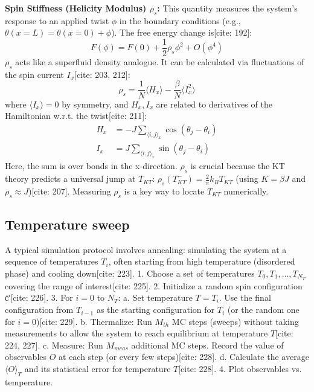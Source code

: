 \documentclass[11pt]{article}
\begin{document}
\textbf{Spin Stiffness (Helicity Modulus) $\rho_s$:}
This quantity measures the system's response to an applied twist $\phi$ in the boundary conditions (e.g., $\theta(x=L) = \theta(x=0) + \phi$). The free energy change is[cite: 192]:
\begin{equation}
F(\phi) = F(0) + \frac{1}{2} \rho_s \phi^2 + O(\phi^4) \label{eq:stiffness_F}
\end{equation}
$\rho_s$ acts like a superfluid density analogue. It can be calculated via fluctuations of the spin current $I_x$[cite: 203, 212]:
\begin{equation}
\rho_s = \frac{1}{N} \langle H_x \rangle - \frac{\beta}{N} \langle I_x^2 \rangle \label{eq:stiffness_fluct}
\end{equation}
where $\langle I_x \rangle = 0$ by symmetry, and $H_x, I_x$ are related to derivatives of the Hamiltonian w.r.t. the twist[cite: 211]:
\begin{align}
H_x &= -J \sum_{\langle i,j \rangle_x} \cos(\theta_j - \theta_i) \label{eq:stiffness_Hx} \\
I_x &= J \sum_{\langle i,j \rangle_x} \sin(\theta_j - \theta_i) \label{eq:stiffness_Ix}
\end{align}
Here, the sum is over bonds in the x-direction. $\rho_s$ is crucial because the KT theory predicts a universal jump at $T_{KT}$: $\rho_s(T_{KT}^-) = \frac{2}{\pi} k_B T_{KT}$ (using $K = \beta J$ and $\rho_s \approx J$)[cite: 207]. Measuring $\rho_s$ is a key way to locate $T_{KT}$ numerically.

\subsection{Temperature sweep}

A typical simulation protocol involves annealing: simulating the system at a sequence of temperatures $T_i$, often starting from high temperature (disordered phase) and cooling down[cite: 223].
1.  Choose a set of temperatures $T_0, T_1, \dots, T_{N_T}$ covering the range of interest[cite: 225].
2.  Initialize a random spin configuration $\mathcal{C}$[cite: 226].
3.  For $i = 0$ to $N_T$:
    a. Set temperature $T = T_i$. Use the final configuration from $T_{i-1}$ as the starting configuration for $T_i$ (or the random one for $i=0$)[cite: 229].
    b. Thermalize: Run $M_{th}$ MC steps (sweeps) without taking measurements to allow the system to reach equilibrium at temperature $T$[cite: 224, 227].
    c. Measure: Run $M_{meas}$ additional MC steps. Record the value of observables $O$ at each step (or every few steps)[cite: 228].
    d. Calculate the average $\langle O \rangle_T$ and its statistical error for temperature $T$[cite: 228].
4.  Plot observables vs. temperature.
\end{document}
